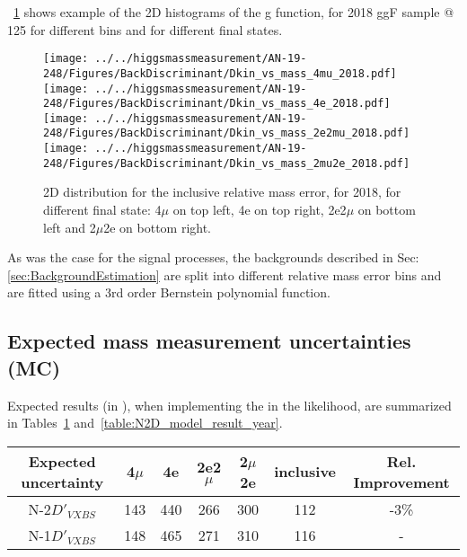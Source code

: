 \figurename~\ref{2D_distribution} shows example of the 2D histograms of the g function, for 2018 ggF sample @ 125 \GeV
for different bins and for different final states.
\begin{figure}[!htbp]
\begin{center}
	\texttt{[image: ../../higgsmassmeasurement/AN-19-248/Figures/BackDiscriminant/Dkin\_vs\_mass\_4mu\_2018.pdf]}
	\texttt{[image: ../../higgsmassmeasurement/AN-19-248/Figures/BackDiscriminant/Dkin\_vs\_mass\_4e\_2018.pdf]}
	\texttt{[image: ../../higgsmassmeasurement/AN-19-248/Figures/BackDiscriminant/Dkin\_vs\_mass\_2e2mu\_2018.pdf]}
\texttt{[image: ../../higgsmassmeasurement/AN-19-248/Figures/BackDiscriminant/Dkin\_vs\_mass\_2mu2e\_2018.pdf]}
\caption{
2D distribution for the inclusive relative mass error, for 2018, for different final state:
4$\mu$ on top left, 4e on top right, 2e2$\mu$ on bottom left and 2$\mu$2e on bottom right.}
\label{2D_distribution}
\end{center}
\end{figure}

As was the case for the signal processes, the backgrounds described in Sec: \ref{sec:BackgroundEstimation} are split into different relative mass error bins and are fitted using a 3rd order Bernstein polynomial function.

\subsection{Expected mass measurement uncertainties (MC)}
Expected results (in \MeV), when implementing the \Dkinbkg in the likelihood, 
are summarized in Tables~\ref{table:N2D_model_result} and~\ref{table:N2D_model_result_year}.
\begin{table}[ht]	
\begin{center}
	\begin{tabular}{ccccccc}
	\hline			
	Expected uncertainty	&	4$\mu$	&	4e	&	2e2$\mu$	&2$\mu$2e	& inclusive	&	 Rel. Improvement \\
	\hline			
	N-2$D'_{VXBS}$	&	143	&	440	&	266	&	300	&	112	&	-3\%	\\
	N-1$D'_{VXBS}$	&	148	&	465	&	271	&	310	&	116	&	-	\\
	\hline
	\end{tabular}
	\label{table:N2D_model_result} 
\end{center}
\end{table}

